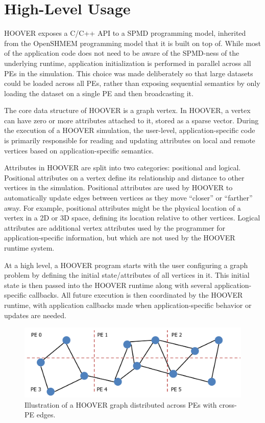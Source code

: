 \section{High-Level Usage}

HOOVER exposes a C/C++ API  to a SPMD programming model, inherited from the
OpenSHMEM programming model that it is built on top of. While most of the
application code does not need to be aware of the SPMD-ness of the underlying
runtime, application initialization is performed in parallel across all PEs in the
simulation. This choice was made deliberately so that large datasets could be
loaded across all PEs, rather than exposing sequential semantics by only
loading the dataset on a single PE and then broadcasting it.

The core data structure of HOOVER is a graph vertex. In HOOVER, a vertex can
have zero or more attributes attached to it, stored as a sparse
vector. During the execution of a HOOVER simulation, the user-level, application-specific
code is primarily responsible for reading and updating attributes
on local and remote vertices based on application-specific semantics.

Attributes in HOOVER are split into two categories: positional and logical.
Positional attributes on a vertex define its relationship and distance to other
vertices in the simulation. Positional attributes are used by HOOVER to
automatically update edges between vertices as they move ``closer'' or ``farther'' away.
For example, positional attributes might be the physical location of a
vertex in a 2D or 3D space, defining its location relative to other vertices.
Logical attributes are additional vertex attributes used by the
programmer for application-specific information, but which are not used by the
HOOVER runtime system.

At a high level, a HOOVER program starts with the user configuring a graph
problem by defining the initial state/attributes of all vertices in it. This
initial state is then passed into the HOOVER runtime along with several
application-specific callbacks. All future execution is then coordinated by the
HOOVER runtime, with application callbacks made when application-specific
behavior or updates are needed.

\begin{figure}
\includegraphics[width=\columnwidth]{pe_diag.png}
\caption{Illustration of a HOOVER graph distributed across PEs with cross-PE
    edges.}
\label{fig:pe_diag}
\end{figure}

